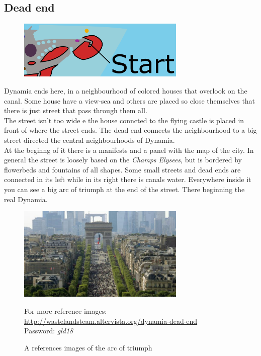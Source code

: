 \subsection{Dead end}
\begin{figure}[H]
  \centering
  \includegraphics[width=8cm]{Images/Maps/deadEnd}
\end{figure}
Dynamia ends here, in a neighbourhood of colored houses that overlook on the canal. Some house have a view-sea and others are placed so close themselves that there is just street that pass through them all. \\
The street isn't too wide e the house conncted to the flying castle is placed in front of where the street ends. 
The dead end connects the neighbourhood to a big street directed the central neighbourhoods of Dynamia. \\
At the beginng of it there is a manifests and a panel with the map of the city. 
In general the street is loosely based on the \textit{Champs Elysees}, but is bordered by flowerbeds and fountains of all shapes.
Some small streets and dead ends are connected in its left while in its right there is canals water.
Everywhere inside it you can see a big arc of triumph at the end of the street. There beginning the real Dynamia.
\begin{figure}[H]
  \centering
  \includegraphics[width=8cm]{Images/Landmarks/arcOfTriumph}
  \caption{A references images of the arc of triumph}
  For more reference images: \href{http://wastelandsteam.altervista.org/dynamia-dead-end}{http://wastelandsteam.altervista.org/dynamia-dead-end}\\Password: \textit{gld18}
\end{figure}

